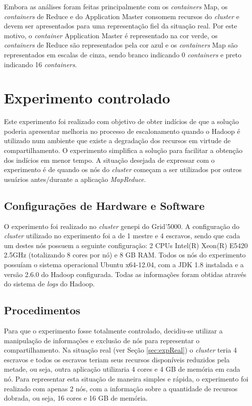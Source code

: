 Embora as análises foram feitas principalmente com os \textit{containers} Map, os \textit{containers} de Reduce e do Application Master consomem recursos do \textit{cluster} e devem ser apresentados para uma representação fiel da situação real. Por este motivo, o \textit{container} Application Master é representado na cor verde, os \textit{containers} de Reduce são representados pela cor azul e os \textit{containers} Map são representados em escalas de cinza, sendo branco indicando 0 \textit{containers} e preto indicando 16 \textit{containers}.

\section{Experimento controlado}
Este experimento foi realizado com objetivo de obter indícios de que a solução poderia apresentar melhoria no processo de escalonamento quando o Hadoop é utilizado num ambiente que existe a degradação dos recursos em virtude de compartilhamento. O experimento simplifica a solução para facilitar a obtenção dos indícios em menor tempo. A situação desejada de expressar com o experimento é de quando os nós do \textit{cluster} começam a ser utilizados por outros usuários antes/durante a aplicação \textit{MapReduce}.

\subsection{Configurações de Hardware e Software}
O experimento foi realizado no \textit{cluster} genepi do Grid'5000. A configuração do \textit{cluster} utilizado no experimento foi a de 1 mestre e 4 escravos, sendo que cada um destes nós possuem a seguinte configuração: 2 CPUs Intel(R) Xeon(R) E5420 2.5GHz (totalizando 8 cores por nó) e 8 GB RAM. Todos os nós do experimento possuíam o sistema operacional Ubuntu x64-12.04, com a JDK 1.8 instalada e a versão 2.6.0 do Hadoop configurada. Todas as informações foram obtidas através do sistema de \textit{logs} do Hadoop.

\subsection{Procedimentos}
Para que o experimento fosse totalmente controlado, decidiu-se utilizar a manipulação de informações e exclusão de nós para representar o compartilhamento. Na situação real (ver Seção \ref{sec:expReal}) o \textit{cluster} teria 4 escravos e todos os escravos teriam seus recursos disponíveis reduzidos pela metade, ou seja, outra aplicação utilizaria 4 cores e 4 GB de memória em cada nó. Para representar esta situação de maneira simples e rápida, o experimento foi realizado com apenas 2 nós, com a informação sobre a quantidade de recursos dobrada, ou seja, 16 cores e 16 GB de memória. 

